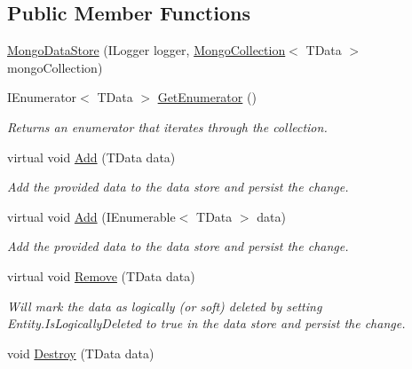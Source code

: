\subsection*{Public Member Functions}
\begin{DoxyCompactItemize}
\item 
\hyperlink{classCqrs_1_1Mongo_1_1DataStores_1_1MongoDataStore_a39f738d53074a548e6932bacdc4a4e3a}{Mongo\+Data\+Store} (I\+Logger logger, \hyperlink{classCqrs_1_1Mongo_1_1DataStores_1_1MongoDataStore_aa183a8ce44ec16d755f1e4fbe5ec4b10}{Mongo\+Collection}$<$ T\+Data $>$ mongo\+Collection)
\item 
I\+Enumerator$<$ T\+Data $>$ \hyperlink{classCqrs_1_1Mongo_1_1DataStores_1_1MongoDataStore_a3eeaf3e59a540025ff2aa0f62b5dd465}{Get\+Enumerator} ()
\begin{DoxyCompactList}\small\item\em Returns an enumerator that iterates through the collection. \end{DoxyCompactList}\item 
virtual void \hyperlink{classCqrs_1_1Mongo_1_1DataStores_1_1MongoDataStore_a27bcfb40fe8203e09d320b2aa19fff3a}{Add} (T\+Data data)
\begin{DoxyCompactList}\small\item\em Add the provided {\itshape data}  to the data store and persist the change. \end{DoxyCompactList}\item 
virtual void \hyperlink{classCqrs_1_1Mongo_1_1DataStores_1_1MongoDataStore_a38c242b255dc17cf8d19470fdf5a99bf}{Add} (I\+Enumerable$<$ T\+Data $>$ data)
\begin{DoxyCompactList}\small\item\em Add the provided {\itshape data}  to the data store and persist the change. \end{DoxyCompactList}\item 
virtual void \hyperlink{classCqrs_1_1Mongo_1_1DataStores_1_1MongoDataStore_a64003d01de3ac6ffd0e41bb7f572bf96}{Remove} (T\+Data data)
\begin{DoxyCompactList}\small\item\em Will mark the {\itshape data}  as logically (or soft) deleted by setting Entity.\+Is\+Logically\+Deleted to true in the data store and persist the change. \end{DoxyCompactList}\item 
void \hyperlink{classCqrs_1_1Mongo_1_1DataStores_1_1MongoDataStore_af97319aef1f0484666d9ea12578b8df9}{Destroy} (T\+Data data)

\end{DoxyCompactItemize}
